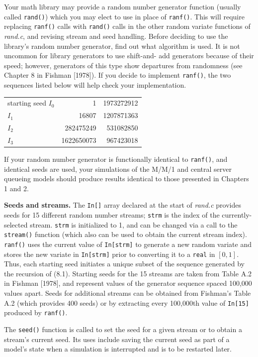 Your math library may provide a random number generator function
(usually called \texttt{rand()}) which you may elect to use in place of \texttt{ranf()}.
This will require replacing \texttt{ranf()} calls with \texttt{rand()} calls in the other random
variate functions of \textit{rand.c}, and revising stream and seed handling.
Before deciding to use the library's random number generator, find out what
algorithm is used. It is not uncommon for library generators to use shift-and-
add generators because of their speed; however, generators of this type show
departures from randomness (see Chapter 8 in Fishman [1978]). If you decide
to implement \texttt{ranf()}, the two sequences listed below will help check your
implementation.
\begin{center}
\begin{tabular}{lrr}
starting seed $I_0$ & 1 & 1973272912\\
$I_1$ & 16807 & 1207871363\\
$I_2$ & 282475249 & 531082850\\
$I_3$ & 1622650073 & 967423018
\end{tabular}
\end{center}
If your random number generator is functionally identical to \texttt{ranf()}, and
identical seeds are used, your simulations of the M/M/1 and central server
queueing models should produce results identical to those presented in
Chapters 1 and 2.

\textbf{Seeds and streams.} The \texttt{In[]} array declared at the start of \textit{rand.c}
provides seeds for 15 different random number streams; \texttt{strm} is the index of
the currently-selected stream. \texttt{strm} is initialized to 1, and can be changed
via a call to the \texttt{stream()} function (which also can be used to obtain the
current stream index). \texttt{ranf()} uses the current value of \texttt{In[strm]} to
generate a new random variate and stores the new variate in \texttt{In[strm]} prior
to converting it to a \texttt{real} in $[0,1]$. Thus, each starting seed initiates a unique
subset of the sequence generated by the recursion of (8.1). Starting seeds for
the 15 streams are taken from Table A.2 in Fishman [1978], and represent
values of the generator sequence spaced 100,000 values apart. Seeds for
additional streams can be obtained from Fishman's Table A.2 (which
provides 400 seeds) or by extracting every 100,000th value of \texttt{In[15]}
produced by \texttt{ranf()}.

The \texttt{seed()} function is called to set the seed for a given stream or to
obtain a stream's current seed. Its uses include saving the current seed as part
of a model's state when a simulation is interrupted and is to be restarted
later.

